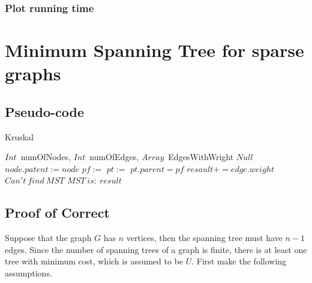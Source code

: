 \documentclass{article}
\begin{document}
\subsubsection{Plot running time}

\newpage
\section{Minimum Spanning Tree for sparse graphs}
\subsection{Pseudo-code}
\begin{algorithm}
\caption{Kruskal}
    \begin{algorithmic}[1]
        \Require $Int$\ numOfNodes, $Int$\ numOfEdges, $Array$\ EdgesWithWright
        \Ensure $Null$
                \State $node.patent := node$
            \EndIf
            \State {}
                \State $pf := $
                \State $pt := $
                    \State  $pt.parent = pf$
                    \State $resault += edge.weight$
                \EndIf
            \EndWhile
                \State $Can't\ find\ MST$
            \Else
                \State $MST\ is:\ result$
            \EndIf
        \EndFunction
    \end{algorithmic} 
\end{algorithm} 

\subsection{Proof of Correct}
Suppose that the graph $G$ has $n$ vertices, then the spanning tree must have $n-1$ edges. Since the number of spanning trees of a graph is finite, there is at least one tree with minimum cost, which is assumed to be $U$. First make the following assumptions.\\
\end{document}
